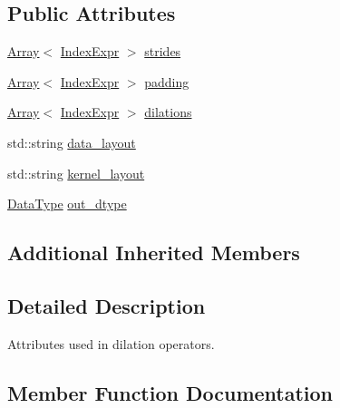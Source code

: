 \subsection*{Public Attributes}
\begin{DoxyCompactItemize}
\item 
\hyperlink{classtvm_1_1Array}{Array}$<$ \hyperlink{namespacetvm_1_1relay_ae153a27d81399fd266b8d598227764c4}{Index\+Expr} $>$ \hyperlink{structtvm_1_1relay_1_1Dilation2DAttrs_a56303dd847fb1ac956343ae0ecb6a126}{strides}
\item 
\hyperlink{classtvm_1_1Array}{Array}$<$ \hyperlink{namespacetvm_1_1relay_ae153a27d81399fd266b8d598227764c4}{Index\+Expr} $>$ \hyperlink{structtvm_1_1relay_1_1Dilation2DAttrs_a775456a2b4d3f24b4c0b222b46fe5cf7}{padding}
\item 
\hyperlink{classtvm_1_1Array}{Array}$<$ \hyperlink{namespacetvm_1_1relay_ae153a27d81399fd266b8d598227764c4}{Index\+Expr} $>$ \hyperlink{structtvm_1_1relay_1_1Dilation2DAttrs_a27059af94a599f71d2561b5a6f11eaa2}{dilations}
\item 
std\+::string \hyperlink{structtvm_1_1relay_1_1Dilation2DAttrs_ac449ae6daf722a2d1826cac252368f71}{data\+\_\+layout}
\item 
std\+::string \hyperlink{structtvm_1_1relay_1_1Dilation2DAttrs_aecf84f5da8bfbe44e0c90c72ce3a4a53}{kernel\+\_\+layout}
\item 
\hyperlink{namespacetvm_a41918af1a1dc386388639a9d3ad06c5d}{Data\+Type} \hyperlink{structtvm_1_1relay_1_1Dilation2DAttrs_aa65914cc64739d6b057a359375981745}{out\+\_\+dtype}
\end{DoxyCompactItemize}
\subsection*{Additional Inherited Members}


\subsection{Detailed Description}
Attributes used in dilation operators. 

\subsection{Member Function Documentation}
